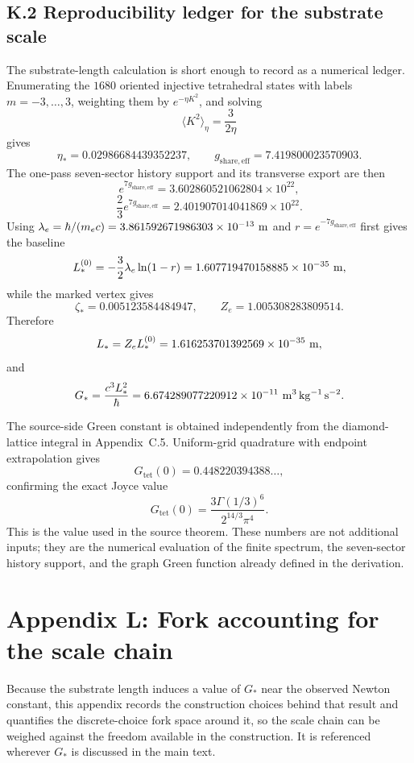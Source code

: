 \documentclass[11pt]{article}
\begin{document}
\subsection*{K.2 Reproducibility ledger for the substrate scale}

The substrate-length calculation is short enough to record as a numerical ledger. Enumerating the $1680$ oriented injective tetrahedral states with labels $m=-3,\ldots,3$, weighting them by $e^{-\eta K^2}$, and solving
\[
\langle K^2\rangle_\eta=\frac{3}{2\eta}
\]
gives
\[
\eta_*=0.02986684439352237,
\qquad
g_{\mathrm{share,eff}}=7.419800023570903.
\]
The one-pass seven-sector history support and its transverse export are then
\[
e^{7g_{\mathrm{share,eff}}}
=
3.602860521062804\times10^{22},
\]
\[
\frac23 e^{7g_{\mathrm{share,eff}}}
=
2.401907014041869\times10^{22}.
\]
Using $\lambda_e=\hbar/(m_ec)=3.861592671986303\times10^{-13}\ {\rm m}$ and $r=e^{-7g_{\mathrm{share,eff}}}$ first gives the baseline
\[
L_*^{(0)}=-\frac32\lambda_e\ln(1-r)
=
1.607719470158885\times10^{-35}\ {\rm m},
\]
while the marked vertex gives
\[
\zeta_*=0.005123584484947,
\qquad
Z_e=1.005308283809514.
\]
Therefore
\[
L_*=Z_eL_*^{(0)}
=1.616253701392569\times10^{-35}\ {\rm m},
\]
and
\[
G_*=\frac{c^3L_*^2}{\hbar}
=
6.674289077220912\times10^{-11}\ {\rm m^3\,kg^{-1}\,s^{-2}}.
\]

The source-side Green constant is obtained independently from the diamond-lattice integral in Appendix~C.5. Uniform-grid quadrature with endpoint extrapolation gives
\[
G_{\mathrm{tet}}(0)=0.448220394388\ldots ,
\]
confirming the exact Joyce value
\[
G_{\mathrm{tet}}(0)
=
\frac{3\Gamma(1/3)^6}{2^{14/3}\pi^4}.
\]
This is the value used in the source theorem. These numbers are not additional inputs; they are the numerical evaluation of the finite spectrum, the seven-sector history support, and the graph Green function already defined in the derivation.

\section*{Appendix L: Fork accounting for the scale chain}

Because the substrate length induces a value of $G_*$ near the observed Newton constant, this appendix records the construction choices behind that result and quantifies the discrete-choice fork space around it, so the scale chain can be weighed against the freedom available in the construction. It is referenced wherever $G_*$ is discussed in the main text.
\end{document}
